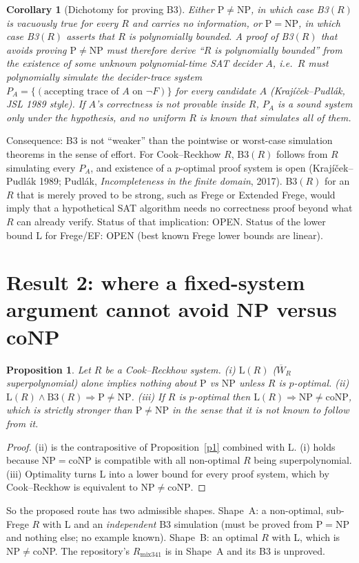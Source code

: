 \documentclass{article}
\newtheorem{prop}{Proposition}
\newtheorem{cor}{Corollary}
\begin{document}
\begin{cor}[Dichotomy for proving B3]\label{c1}
Either $\mathrm P\ne\mathrm{NP}$, in which case B3$(R)$ is vacuously true for every $R$ and carries no information, or $\mathrm P=\mathrm{NP}$, in which case B3$(R)$ asserts that $R$ is polynomially bounded. A proof of B3$(R)$ that avoids proving $\mathrm P\ne\mathrm{NP}$ must therefore derive ``$R$ is polynomially bounded'' from the existence of \emph{some unknown} polynomial-time SAT decider $A$, i.e.\ $R$ must polynomially simulate the decider-trace system $P_A=\{(\text{accepting trace of }A\text{ on }\neg F)\}$ for every candidate $A$ (Krajíček--Pudl\'ak, JSL 1989 style). If $A$'s correctness is not provable inside $R$, $P_A$ is a sound system only under the hypothesis, and no uniform $R$ is known that simulates all of them.
\end{cor}
Consequence: B3 is not ``weaker'' than the pointwise or worst-case simulation theorems in the sense of effort. For Cook--Reckhow $R$, B3$(R)$ follows from $R$ simulating every $P_A$, and existence of a $p$-optimal proof system is open (Krajíček--Pudl\'ak 1989; Pudl\'ak, \emph{Incompleteness in the finite domain}, 2017). B3$(R)$ for an $R$ that is merely proved to be strong, such as Frege or Extended Frege, would imply that a hypothetical SAT algorithm needs no correctness proof beyond what $R$ can already verify. Status of that implication: OPEN. Status of the lower bound L for Frege/EF: OPEN (best known Frege lower bounds are linear).

\section*{Result 2: where a fixed-system argument cannot avoid NP versus coNP}
\begin{prop}\label{p2}
Let $R$ be a Cook--Reckhow system. (i) $\mathrm L(R)$ ($\overline W_R$ superpolynomial) alone implies nothing about $\mathrm P$ vs $\mathrm{NP}$ unless $R$ is $p$-optimal. (ii) $\mathrm L(R)\wedge\mathrm B3(R)\Rightarrow\mathrm P\ne\mathrm{NP}$. (iii) If $R$ is $p$-optimal then $\mathrm L(R)\Rightarrow\mathrm{NP}\ne\mathrm{coNP}$, which is strictly stronger than $\mathrm P\ne\mathrm{NP}$ in the sense that it is not known to follow from it.
\end{prop}
\begin{proof}
(ii) is the contrapositive of Proposition~\ref{p1} combined with L. (i) holds because $\mathrm{NP}=\mathrm{coNP}$ is compatible with all non-optimal $R$ being superpolynomial. (iii) Optimality turns L into a lower bound for every proof system, which by Cook--Reckhow is equivalent to $\mathrm{NP}\ne\mathrm{coNP}$. \qedhere
\end{proof}
So the proposed route has two admissible shapes. Shape~A: a non-optimal, sub-Frege $R$ with L and an \emph{independent} B3 simulation (must be proved from $\mathrm P=\mathrm{NP}$ and nothing else; no example known). Shape~B: an optimal $R$ with L, which is NP${}\ne{}$coNP. The repository's $R_{\mathrm{mix}341}$ is in Shape~A and its B3 is unproved.
\end{document}
